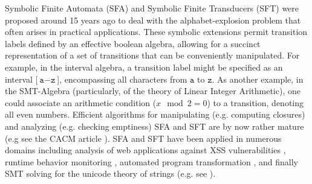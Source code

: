 Symbolic Finite Automata (SFA) and Symbolic Finite Transducers (SFT)
\cite{cav/DAntoniV17, VeanesHLMB12Transducer,DV21} were proposed around 15 years ago
to deal with the alphabet-explosion problem that often arises in practical
applications. 
%
These symbolic extensions permit transition labels defined by an effective 
boolean algebra, allowing for a succinct representation of a set of transitions
that can be conveniently manipulated. 
For example, in the interval algebra, a transition label might be specified as 
an interval [$\texttt{a}-\texttt{z}$], encompassing all characters from
$\texttt{a}$ to $\texttt{z}$. As another example, in the SMT-Algebra
(particularly, of the theory of Linear Integer Arithmetic), %
one could associate an arithmetic condition ($x \mod 2 = 0$) to a transition, 
denoting all even numbers. Efficient algorithms for manipulating (e.g. computing
closures) and analyzing (e.g. checking emptiness) SFA and SFT are by now
rather mature (e.g see the CACM article \cite{DV21}).
SFA and SFT have been applied in numerous domains including analysis of web
applications against XSS vulnerabilities \cite{VeanesHLMB12Transducer,uss/HooimeijerLMSV11},
runtime behavior monitoring \cite{osdi/YaseenABCL20}, automated program
transformation \cite{pldi/HuD17}, and finally SMT solving for the unicode theory
of strings (e.g. see \cite{pacmpl/ChenFHHHKLRW22,CHL+19}).

